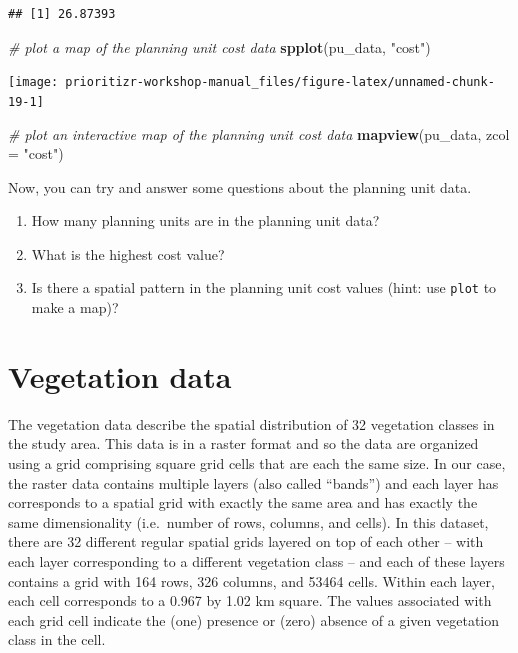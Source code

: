 \documentclass[
  12pt,
]{book}
\makeatletter
\newenvironment{Shaded}{\begin{snugshade}}{\end{snugshade}}
\newcommand{\CommentTok}[1]{\textcolor[rgb]{0.56,0.35,0.01}{\textit{#1}}}
\newcommand{\DataTypeTok}[1]{\textcolor[rgb]{0.13,0.29,0.53}{#1}}
\newcommand{\KeywordTok}[1]{\textcolor[rgb]{0.13,0.29,0.53}{\textbf{#1}}}
\newcommand{\NormalTok}[1]{#1}
\newcommand{\StringTok}[1]{\textcolor[rgb]{0.31,0.60,0.02}{#1}}
\providecommand{\tightlist}{%
  \setlength{\itemsep}{0pt}\setlength{\parskip}{0pt}}
\newenvironment{kframe}{%
\medskip{}
\setlength{\fboxsep}{.8em}
 \def\at@end@of@kframe{}%
 \ifinner\ifhmode%
  \def\at@end@of@kframe{\end{minipage}}%
  \begin{minipage}{\columnwidth}%
 \fi\fi%
 \def\FrameCommand##1{\hskip\@totalleftmargin \hskip-\fboxsep
 \colorbox{shadecolor}{##1}\hskip-\fboxsep
     \hskip-\linewidth \hskip-\@totalleftmargin \hskip\columnwidth}%
 \MakeFramed {\advance\hsize-\width
   \@totalleftmargin\z@ \linewidth\hsize
   \@setminipage}}%
 {\par\unskip\endMakeFramed%
 \at@end@of@kframe}
\newenvironment{rmdblock}[1]
  {
  \begin{itemize}
  \renewcommand{\labelitemi}{
    \raisebox{-.7\height}[0pt][0pt]{
      {\setkeys{Gin}{width=3em,keepaspectratio}\texttt{[image: images/\#1]}}
    }
  }
  \setlength{\fboxsep}{1em}
  \begin{kframe}
  \item
  }
  {
  \end{kframe}
  \end{itemize}
  }
\newenvironment{rmdquestion}
  {\begin{rmdblock}{question}}
  {\end{rmdblock}}
\makeatother
\begin{document}
\begin{verbatim}
## [1] 26.87393
\end{verbatim}

\begin{Shaded}
\begin{Highlighting}[]
\CommentTok{# plot a map of the planning unit cost data}
\KeywordTok{spplot}\NormalTok{(pu_data, }\StringTok{"cost"}\NormalTok{)}
\end{Highlighting}
\end{Shaded}

\begin{center}\texttt{[image: prioritizr-workshop-manual\_files/figure-latex/unnamed-chunk-19-1]} \end{center}

\begin{Shaded}
\begin{Highlighting}[]
\CommentTok{# plot an interactive map of the planning unit cost data}
\KeywordTok{mapview}\NormalTok{(pu_data, }\DataTypeTok{zcol =} \StringTok{"cost"}\NormalTok{)}
\end{Highlighting}
\end{Shaded}

Now, you can try and answer some questions about the planning unit data.

\begin{rmdquestion}
\begin{enumerate}
\def\labelenumi{\arabic{enumi}.}
\tightlist
\item
  How many planning units are in the planning unit data?
\item
  What is the highest cost value?
\item
  Is there a spatial pattern in the planning unit cost values (hint: use \texttt{plot} to make a map)?
\end{enumerate}
\end{rmdquestion}

\clearpage

\hypertarget{vegetation-data}{%
\section{Vegetation data}\label{vegetation-data}}

The vegetation data describe the spatial distribution of 32 vegetation classes in the study area. This data is in a raster format and so the data are organized using a grid comprising square grid cells that are each the same size. In our case, the raster data contains multiple layers (also called ``bands'') and each layer has corresponds to a spatial grid with exactly the same area and has exactly the same dimensionality (i.e.~number of rows, columns, and cells). In this dataset, there are 32 different regular spatial grids layered on top of each other -- with each layer corresponding to a different vegetation class -- and each of these layers contains a grid with 164 rows, 326 columns, and 53464 cells. Within each layer, each cell corresponds to a 0.967 by 1.02 km square. The values associated with each grid cell indicate the (one) presence or (zero) absence of a given vegetation class in the cell.
\end{document}
